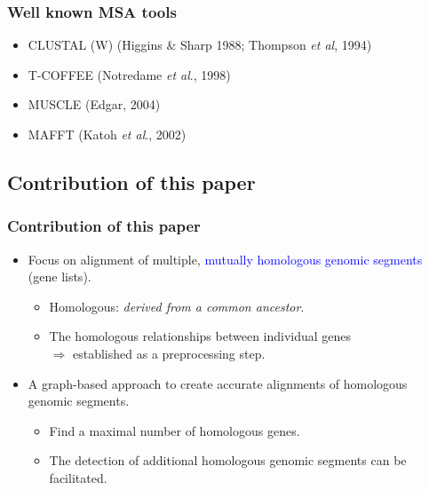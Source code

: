 \documentclass[xcolor=dvipsnames,envcountsect,handout]{beamer}
\begin{document}
\begin{frame}
\frametitle{Well known MSA tools}
\begin{itemize}
\item CLUSTAL (W) (Higgins \& Sharp 1988; Thompson {\it et al}, 1994)
\vspace{6pt}
\item T-COFFEE (Notredame {\it et al}., 1998)
\vspace{6pt}
\item MUSCLE (Edgar, 2004)
\vspace{6pt}
\item MAFFT (Katoh {\it et al}., 2002)
\end{itemize}
\end{frame}



\subsection{Contribution of this paper}


\begin{frame}
\frametitle{Contribution of this paper}
\begin{itemize}
\item Focus on alignment of multiple, \textcolor{blue}{mutually
homologous genomic segments} (\alert{gene lists}). \pause
\begin{itemize}
\item Homologous: {\em derived from a common ancestor}.
\item The homologous relationships between individual genes\\
$\Rightarrow$ established as a preprocessing step. 
\end{itemize}
\vspace{10pt}
\pause
\item A graph-based approach to create accurate alignments of
homologous genomic segments. \pause
\begin{itemize}
\item Find a maximal number of homologous genes.
\item The detection of additional homologous genomic segments can be
facilitated. 
\end{itemize}
\end{itemize} 
\end{frame}
\end{document}
